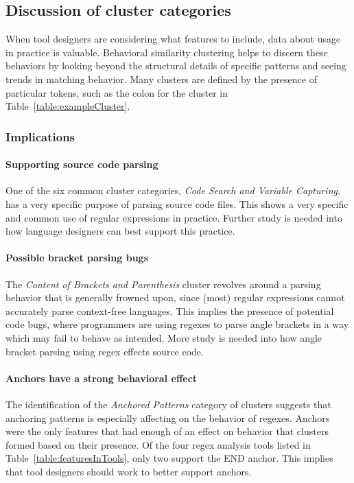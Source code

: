 \subsection{Discussion of cluster categories}
When tool designers are considering what features to include, data about usage in practice is valuable.  Behavioral similarity clustering  helps to discern these behaviors by looking beyond the structural details of specific patterns and seeing trends in  matching behavior. Many clusters are defined by the presence of particular tokens, such as the colon for the cluster in Table~\ref{table:exampleCluster}.

\subsubsection{Implications}

\paragraph{Supporting source code parsing}  One of the six common cluster categories, \emph{Code Search and Variable Capturing}, has a very specific purpose of parsing source code files. This shows a very specific and common use of regular expressions in practice.  Further study is needed into how language designers can best support this practice.

\paragraph{Possible bracket parsing bugs} The \emph{Content of Brackets and Parenthesis} cluster revolves around a parsing behavior that is generally frowned upon, since (most) regular expressions cannot accurately parse context-free languages.  This implies the presence of potential code bugs, where programmers are using regexes to parse angle brackets in a way which may fail to behave as intended.  More study is needed into how angle bracket parsing using regex effects source code.

\paragraph{Anchors have a strong behavioral effect}  The identification of the \emph{Anchored Patterns} category of clusters suggests that anchoring patterns is especially affecting on the behavior of regexes.  Anchors were the only features that had enough of an effect on behavior that clusters formed based on their presence.  Of the four regex analysis tools listed in Table~\ref{table:featuresInTools}, only two support the END anchor.  This implies that tool designers should work to better support anchors.

